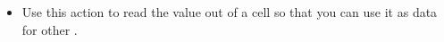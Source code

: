
\begin{itemize}
\item Use this action to read the value out of a cell so that you can use it as data for other \gdsteps{}. 
\end{itemize}
